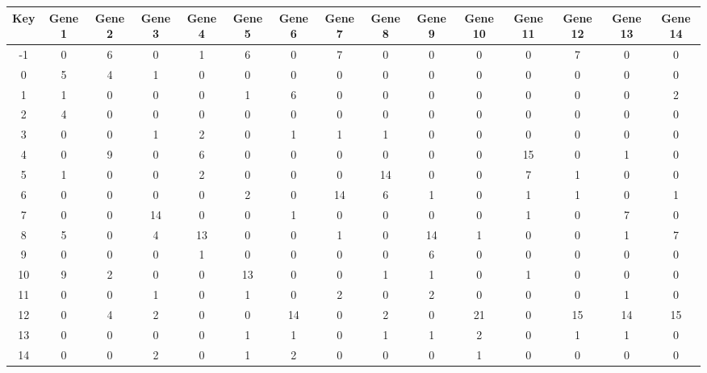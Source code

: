 \begin{tabular}{|c|c|c|c|c|c|c|c|c|c|c|c|c|c|c|}
\hline
Key & Gene 1 & Gene 2 & Gene 3 & Gene 4 & Gene 5 & Gene 6 & Gene 7 & Gene 8 & Gene 9 & Gene 10 & Gene 11 & Gene 12 & Gene 13 & Gene 14 \\
\hline
-1 & 0 & 6 & 0 & 1 & 6 & 0 & 7 & 0 & 0 & 0 & 0 & 7 & 0 & 0 \\
0 & 5 & 4 & 1 & 0 & 0 & 0 & 0 & 0 & 0 & 0 & 0 & 0 & 0 & 0 \\
1 & 1 & 0 & 0 & 0 & 1 & 6 & 0 & 0 & 0 & 0 & 0 & 0 & 0 & 2 \\
2 & 4 & 0 & 0 & 0 & 0 & 0 & 0 & 0 & 0 & 0 & 0 & 0 & 0 & 0 \\
3 & 0 & 0 & 1 & 2 & 0 & 1 & 1 & 1 & 0 & 0 & 0 & 0 & 0 & 0 \\
4 & 0 & 9 & 0 & 6 & 0 & 0 & 0 & 0 & 0 & 0 & 15 & 0 & 1 & 0 \\
5 & 1 & 0 & 0 & 2 & 0 & 0 & 0 & 14 & 0 & 0 & 7 & 1 & 0 & 0 \\
6 & 0 & 0 & 0 & 0 & 2 & 0 & 14 & 6 & 1 & 0 & 1 & 1 & 0 & 1 \\
7 & 0 & 0 & 14 & 0 & 0 & 1 & 0 & 0 & 0 & 0 & 1 & 0 & 7 & 0 \\
8 & 5 & 0 & 4 & 13 & 0 & 0 & 1 & 0 & 14 & 1 & 0 & 0 & 1 & 7 \\
9 & 0 & 0 & 0 & 1 & 0 & 0 & 0 & 0 & 6 & 0 & 0 & 0 & 0 & 0 \\
10 & 9 & 2 & 0 & 0 & 13 & 0 & 0 & 1 & 1 & 0 & 1 & 0 & 0 & 0 \\
11 & 0 & 0 & 1 & 0 & 1 & 0 & 2 & 0 & 2 & 0 & 0 & 0 & 1 & 0 \\
12 & 0 & 4 & 2 & 0 & 0 & 14 & 0 & 2 & 0 & 21 & 0 & 15 & 14 & 15 \\
13 & 0 & 0 & 0 & 0 & 1 & 1 & 0 & 1 & 1 & 2 & 0 & 1 & 1 & 0 \\
14 & 0 & 0 & 2 & 0 & 1 & 2 & 0 & 0 & 0 & 1 & 0 & 0 & 0 & 0 \\
\hline
\end{tabular}